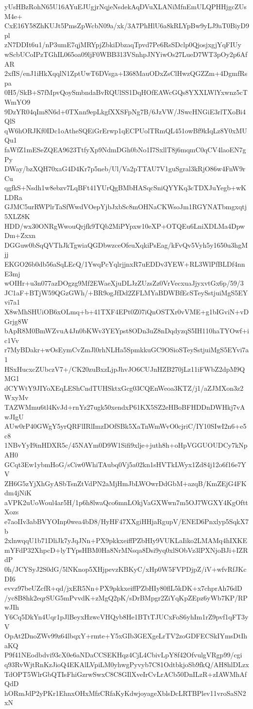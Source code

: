 yUsHBzRohN65U16AYuEJUgjrNqjeNsdekAqDVuXLANiMfnEmULQPHHjgcZUsM4e+
CxE16Y58ZhKUJt5PmsZpWcbN09a/xk/3A7PhHlU6a8kRLYpBw9yLJ9aT0BiyD9pl
zN7DDIt6u1/nP3umE7qjMRYpjZbkiDbzaqTpvd7Pe6RsSDclp0QjosjxgjYqFIUy
wScbUCoIPzTGhIL065oa09ljF0WBB313VSnhpJNYiwOs27LueD7WT3pOy2p6AfAR
2xfIS/enJ1iHkXqqlN1ZptUwT6DVsga+I368MauODxZsClHwzQGZZm+4DgmfRspa
0H5/SkB+S7fMpvQoySmbndaBvRQUlSS1DqHOfEAWcGQs8YXXLWlYxwnz5cTWmYO9
9DzYR04qIm8N6d+0TXnn9epLkgfXXSFpNg7B/6JzVW/JSwcHNGiE3rlTXoBi4QlS
qW6hORJKf0IDc1oAtheSQEiGrErwp1qECPUolTRmQL451owBf9kIqLz8Y0xMUQu1
faWfZ1mESeZQEA9623TtfyXp9NdmDGh0bNo1I7SxllT8j6mqmC0qCV4laoEN7gPy
DWay/bzXQH70xaG4D4Kr7p5neb/Ul/Va2pTTAU7V1guSgral3kRjO86w4FnW9rCu
qgfkS+Nsdh1w8ebzv7LqBFt41YUrQgBMbHASqcSniQYYKq3cTDXJuYegb+wKLDRa
GJMC5urRWPlrTaSfWwdVOepYjbJxbSc8mOHNaCKWsoJm1RGYNATbmgxqtj5XLZ8K
HDD/wx30ONRgWwouQrjfk9TQb2MiPYpxw10eXP+OTQEu6LniXDLMa4DpwDm+Zxxn
DGGuw0bSqQVThJkTgwiaQGDbwzceOfeuXqkiPsEag/kFvQv5Vyh5y1650u3hgMjj
EKGO26b0db56aSqLEcQ/1YwqPcYqlrjjnxR7uEDDv3YEW+RL3WlPfBLDf4nnE3mj
wOIHr+u3n077azDOgzg9Mf2EWaeXjuDLJzZUzsZz0VrVecxuaJjyxvtGx6p/59/3
JC1aF+BTjW59QGzGWh/+BR9ogJfDd2ZFLMYaBDWBfEcSTeySstjuiMgS5EYvi7a1
X8wMhSHUiOB6xOLmq+b+41TXF4EPt0Z07iQnOSTXr0vVME+g1bIGviN+vDGrjg8W
bApR8M0BmWZvuA4Jn0bKWv3YEYpst8ODn3uZ8nDqdyzqS5IH110haTYOwf+ic1Vv
r7MyBDakr+wOsEymCvZmJl0rhNLHa5SpmkkuGC9OSioSTeySstjuiMgS5EYvi7a1
HSxHucxcZUbczV7+/CK20zuBxzLjpJhvJO6CUJnHZB270jLz11iFWbZ2dpM9QMG1
dCYWtY9JIYoXEqLEShCndTUHSktxGcg03CQEnWeoa3KTZ/j1/aZJMXon3z2WxyMv
TAZWMmu6tl4KvJd+rnYz27ugk50xendxP61KX5SZ2eHBoBFHDDnDWHkj7vAwJIgU
AUw0rP40GWgY5yrQRFlIRlImzDOfSBk5XaTnWmWvO0cjriC/IY10SIwI2n6+e5c8
1NBvYyI9inHDXR5c/45NAYm0D9W1Sifi9xlje+juth8h+oHpVGGUOUDCy7kNpAH0
GCqt3Ew1ybmHoG/sCiw0WhiTAubq0Vj5a02kn1sHVTkLWyx1Zd84j12o6f16e7YV
ZH6G5zYjXhGyASbTsnZtVdPN2aMjHmJbLWOwrDdGbM+azqB/KmZEjG4FKdm4jNiK
aVPK2uUoWoul4ar5H/1p6h8lwaQco6mnLOkjVaGXWwn7m5OJ7WGXY4KgOfttXozs
e7aoIIv3abBVYOInp0wea4bD8/HyHF47XXgiHHjaRgupV/ENED6Pnxlyp5SqkX7b
2xlnwqqU1b71DliJk7yJqJNn+PX9pkkxeiffPZbHIy9VUKLaIiko2LMAMq4hIXKE
mYFdP32XhpcD+lyTYpsHBM0Ha8NrMNsqa8Dsi9yq0xlSObVz3lPXNjoBJi+IZRdP
0h/JCYSyJ2S0dG/5lNKnop5XHjpevzKBKyC/xHp0W5FVPDjpZ/iV+wfvRfJKcDI6
evvz97beUZcfR+qd/jxER5Nn+PX9pkkxeiffPZbHIy80flL5kDK+x7chprAh76dD
/yc8B8hk2eqrSUG5mPvvdK+zMgQ2pK/sDrBMpgr2ZiYqKpZEpz6yWb7KP/RPwJIh
Y6Cq5DkYn4Uqr1pJlBeyxHzwcVHQyb8He1BTtTJUCxFoS6yhIm1rZ9pvf1qFT3yV
OpAt2DnoZWv99z64lbqxY+rmte+Y5xGIb3GEXgeLrTV2zoGDFECSkIYmsDtIhaKQ
P9f41NEodbdvi93cX0e6aNDaCCSEKHqz4CjL4CbivLpY8f42OfvulgVRgp99/cgi
q93RvWjtRnKzJioQ4EKAlLVpiLM0yhwgPyvyb7C81OdtbkjoSb9fkQ/AH8hlDLzx
TdOPT5WlrGbQTIsFhiGzrwSwxC8C8GIlXveIrCvLrACb50DnILzR+zIAWMhAfQdD
hORmJdP2yPKr1EhnxOHxMfzCRfaKyKdwjoyageXblsDcLRTBPlev11vroSaSN2xN
